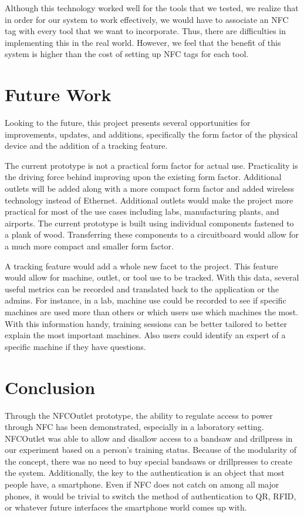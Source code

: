 \documentclass{sigchi}
\begin{document}
Although this technology worked well for the tools that we tested, we realize that in order for our system to work effectively, we would have to associate an NFC tag with every tool that we want to incorporate. Thus, there are difficulties in implementing this in the real world. However, we feel that the benefit of this system is higher than the cost of setting up NFC tags for each tool.
\section{Future Work}
Looking to the future, this project presents several opportunities for improvements, updates, and additions, specifically the form factor of the physical device and the addition of a tracking feature. 

The current prototype is not a practical form factor for actual use. Practicality is the driving force behind improving upon the existing form factor. Additional outlets will be added along with a more compact form factor and added wireless technology instead of Ethernet. Additional outlets would make the project more practical for most of the use cases including labs, manufacturing plants, and airports. The current prototype is built using individual components fastened to a plank of wood. Transferring these components to a circuitboard would allow for a much more compact and smaller form factor. 

A tracking feature would add a whole new facet to the project. This feature would allow for machine, outlet, or tool use to be tracked. With this data, several useful metrics can be recorded and translated back to the application or the admins. For instance, in a lab, machine use could be recorded to see if specific machines are used more than others or which users use which machines the most. With this information handy, training sessions can be better tailored to better explain the most important machines.  Also users could identify an expert of a specific machine if they have questions.
\section{Conclusion}
Through the NFCOutlet prototype, the ability to regulate access to power through NFC has been demonstrated, especially in a laboratory setting. NFCOutlet was able to allow and disallow access to a bandsaw and drillpress in our experiment based on a person’s training status. Because of the modularity of the concept, there was no need to buy special bandsaws or drillpresses to create the system. Additionally, the key to the authentication is an object that most people have, a smartphone. Even if NFC does not catch on among all major phones, it would be trivial to switch the method of authentication to QR, RFID, or whatever future interfaces the smartphone world comes up with. 
\end{document}
